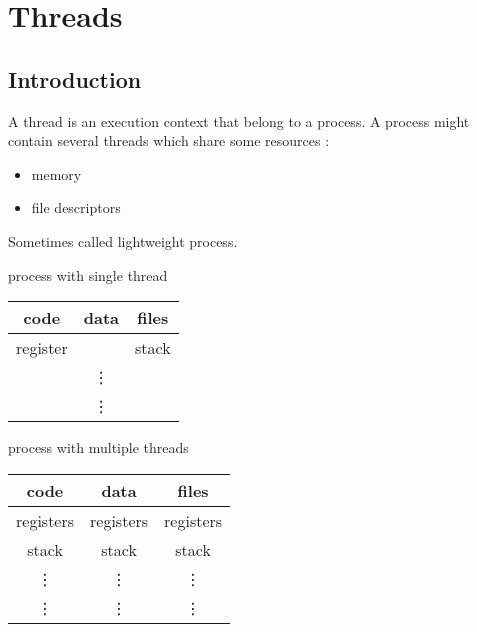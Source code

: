 \chapter{Threads}

\section{Introduction}

A thread is an execution context that belong to a process.
A process might contain several threads which share some resources : 

\begin{itemize}
\item memory
\item file descriptors
\end{itemize}

Sometimes called lightweight process.

\vspace{0.2cm}
\begin{minipage}{0.4\textwidth}
    \begin{center}
        process with single thread
        \begin{tabular}{|c|c|c|}
            \hline
            code & data & files \\
            \hline
            register & & stack \\
            & \vdots & \\
            & \vdots & \\
            \hline
        \end{tabular}
    \end{center}
\end{minipage}
\begin{minipage}{0.4\textwidth}
    \begin{center}
        process with multiple threads
        \begin{tabular}{|c|c|c|}
            \hline
            code & data & files \\
            \hline
            registers & registers & registers \\
            stack& stack & stack \\
            \vdots & \vdots & \vdots \\
            \vdots & \vdots & \vdots \\
            \hline
        \end{tabular}
    \end{center}
\end{minipage}
\vspace{0.2cm}

